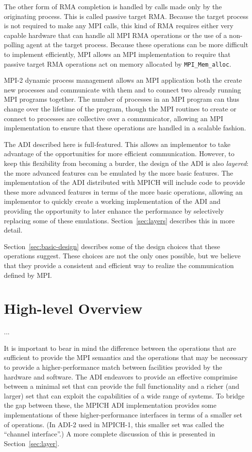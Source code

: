 \documentclass{article}
\def\code#1{\texttt{#1}}
\begin{document}
The other form of RMA completion is handled by calls made only by the
originating process.  This is called passive target RMA.  Because the
target process is not required to make any MPI calls, this kind of RMA
requires either very capable hardware that can handle all MPI RMA
operations or the use of a non-polling agent at the target process.
Because these operations can be more difficult to implement
efficiently, MPI allows an MPI implementation to require that passive
target RMA operations act on memory allocated by
\code{MPI_Mem_alloc}.  

MPI-2 dynamic process management allows an MPI application both the
create new processes and communicate with them and to connect two
already running MPI programs together.  The number of processes in an
MPI program can thus change over the lifetime of the program, though
the MPI routines to create or connect to processes are collective over
a communicator, allowing an MPI implementation to ensure that these
operations are handled in a scalable fashion.

The ADI described here is full-featured.  This allows an implementor
to take advantage of the opportunities for more efficient
communication.  However, to keep this flexibility from becoming a
burder, the design of the ADI is also \emph{layered}: the more
advanced features can be emulated by the more basic features.  The
implementation of the ADI distributed with MPICH will include code to
provide these more advanced features in terms of the more basic
operations, allowing an implementor to quickly create a working
implementation of the ADI and providing the opportunity to later
enhance the performance by selectively replacing some of these
emulations.  Section~\ref{sec:layers} describes this in more detail.

Section~\ref{sec:basic-design} describes some of the design choices that these
operations suggest.  These choices are not the only ones possible, but
we believe that they provide a consistent and efficient way to realize
the communication defined by MPI.

\section{High-level Overview}
\label{sec:high-level}
...

It is important to bear in mind the difference between the operations that are
sufficient to provide the MPI semantics and the operations that may be
necessary to provide a higher-performance match between facilities
provided by the hardware and software.  The ADI endeavors to provide
an effective comprimise between a minimal set that can provide the
full functionality and a richer (and larger) set that can exploit the
capabilities of a wide range of systems.  To bridge the gap between
these, the MPICH ADI implementation provides some implementations of
these higher-performance interfaces in terms of a smaller set of
operations.  (In ADI-2 used in MPICH-1, this smaller set was called
the ``channel interface''.)  A more complete discussion of this is
presented in Section~\ref{sec:layer}.
\end{document}
